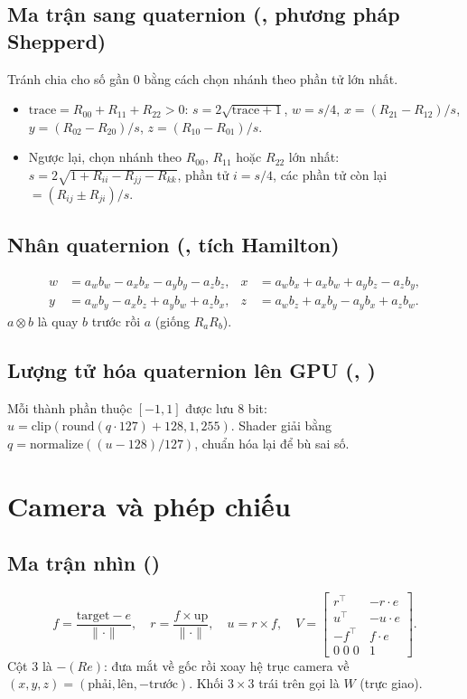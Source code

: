 \subsection{Ma trận sang quaternion (, phương pháp Shepperd)}
Tránh chia cho số gần 0 bằng cách chọn nhánh theo phần tử lớn nhất.
\begin{itemize}
\item $\mathrm{trace}=R_{00}+R_{11}+R_{22}>0$: $s=2\sqrt{\mathrm{trace}+1}$, $w=s/4$, $x=(R_{21}-R_{12})/s$, $y=(R_{02}-R_{20})/s$, $z=(R_{10}-R_{01})/s$.
\item Ngược lại, chọn nhánh theo $R_{00}$, $R_{11}$ hoặc $R_{22}$ lớn nhất: $s=2\sqrt{1+R_{ii}-R_{jj}-R_{kk}}$, phần tử $i=s/4$, các phần tử còn lại $=(R_{ij}\pm R_{ji})/s$.
\end{itemize}

\subsection{Nhân quaternion (, tích Hamilton)}
\begin{align*}
w&=a_wb_w-a_xb_x-a_yb_y-a_zb_z, & x&=a_wb_x+a_xb_w+a_yb_z-a_zb_y,\\
y&=a_wb_y-a_xb_z+a_yb_w+a_zb_x, & z&=a_wb_z+a_xb_y-a_yb_x+a_zb_w.
\end{align*}
$a\otimes b$ là quay $b$ trước rồi $a$ (giống $R_aR_b$).

\subsection{Lượng tử hóa quaternion lên GPU (, )}
Mỗi thành phần thuộc $[-1,1]$ được lưu 8 bit: $u=\mathrm{clip}(\mathrm{round}(q\cdot127)+128,1,255)$. Shader giải bằng $q=\mathrm{normalize}((u-128)/127)$, chuẩn hóa lại để bù sai số.

\section{Camera và phép chiếu}\label{s:cam}

\subsection{Ma trận nhìn ()}
\[
f=\frac{\mathrm{target}-e}{\|\cdot\|},\quad r=\frac{f\times \mathrm{up}}{\|\cdot\|},\quad u=r\times f,\quad
V=\begin{bmatrix} r^{\top} & -r\!\cdot\! e\\ u^{\top} & -u\!\cdot\! e\\ -f^{\top} & f\!\cdot\! e\\ 0\;0\;0 & 1\end{bmatrix}.
\]
Cột 3 là $-(Re)$: đưa mắt về gốc rồi xoay hệ trục camera về $(x,y,z)=(\text{phải},\text{lên},-\text{trước})$. Khối $3\times3$ trái trên gọi là $W$ (trực giao).

